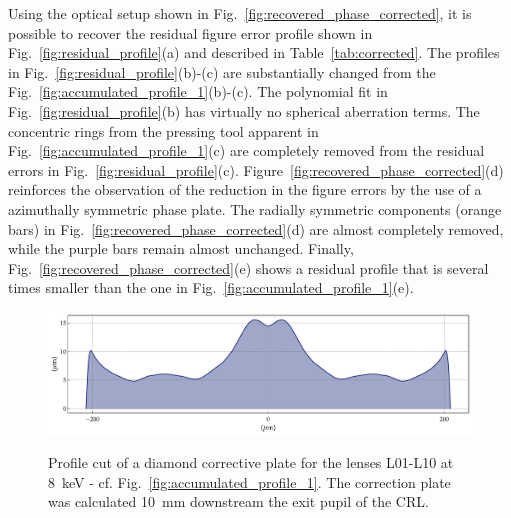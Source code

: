 \begin{refsection}
Using the optical setup shown in Fig.~\ref{fig:recovered_phase_corrected}, it is possible to recover the residual figure error profile shown in Fig.~\ref{fig:residual_profile}(a) and described in Table~\ref{tab:corrected}. The profiles in Fig.~\ref{fig:residual_profile}(b)-(c) are substantially changed from the Fig.~\ref{fig:accumulated_profile_1}(b)-(c). The polynomial fit in Fig.~\ref{fig:residual_profile}(b) has virtually no spherical aberration terms. The concentric rings from the pressing tool apparent in Fig.~\ref{fig:accumulated_profile_1}(c) are completely removed from the residual errors in Fig.~\ref{fig:residual_profile}(c). Figure~\ref{fig:recovered_phase_corrected}(d) reinforces the observation of the reduction in the figure errors by the use of a azimuthally symmetric phase plate. The radially symmetric components (orange bars) in Fig.~\ref{fig:recovered_phase_corrected}(d) are almost completely removed, while the purple bars remain almost unchanged. Finally, Fig.~\ref{fig:recovered_phase_corrected}(e) shows a residual profile that is several times smaller than the one in Fig.~\ref{fig:accumulated_profile_1}(e).


\begin{figure}[t]
        \centering
        {\includegraphics[width=0.6\linewidth]{figures/ch06/CDn_individual_8p0keV_n_10.0_lsp2p0mm_cpp10p0mm_phase_correction_plate_cut_2.pdf}}
        \caption[Diamond correction plate profile cut]{Profile cut of a diamond corrective plate for the lenses L01-L10 at 8~keV - cf. Fig.~\ref{fig:accumulated_profile_1}. The correction plate was calculated 10~mm downstream the exit pupil of the CRL.}\label{fig:plate_profile}
\end{figure}


\end{refsection}
